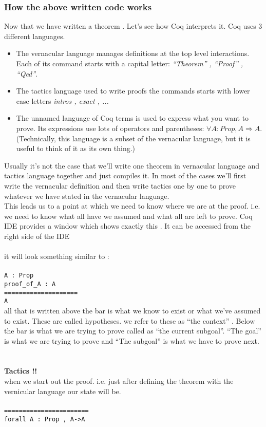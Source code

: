 \documentclass[twocolumn]{book}
\begin{document}
\subsubsection{How the above written code works}
Now that we have written a theorem . Let's see how Coq interprets it. Coq uses 3 different languages.
\begin{itemize}
\item The vernacular language manages definitions at the top level interactions. Each of its command starts with a capital
  letter: \textit{``Theorem'' , ``Proof'' , ``Qed''}.
\item The tactics language used to write proofs the commands starts with lower case letters \textit{intros , exact , ...}
\item The unnamed language of Coq terms is used to express what you want to prove. Its expressions use lots of operators and parentheses: $ \forall A : Prop, A \Longrightarrow A$. (Technically, this language is a subset of the vernacular language, but it is useful to think of it as its own thing.) 
\end{itemize}
Usually it's not the case that we'll write one theorem in vernacular language and tactics language together and just compiles it.
In most of the cases we'll first write the vernacular definition and then write tactics one by one to prove whatever we have
stated in the vernacular language.\\
This leads us to a point at which we need to know where we are at the proof. i.e. we need to know what all have we assumed and
what all are left to prove. Coq IDE provides a window which shows exactly this . It can be accessed from the right side of the IDE
\\ \\
it will look something similar to : \\ \\
\verb|A : Prop|\\
\verb|proof_of_A : A|\\
\verb|====================|\\
\verb|A|\\
all that is written above the bar is what we know to exist or what we've assumed to exist. These are called hypotheses. we refer
to these as ``the context'' . Below the bar is what we are trying to prove called as ``the current subgoal''. ``The goal'' is what
we are trying to prove and ``The subgoal'' is what we have to prove next. \\ \\ \\ 
\textbf{Tactics !!}\\
when we start out the proof. i.e. just after defining the theorem with the vernicular language our state will be.\\
\verb||\\
\verb|=======================|\\
\verb|forall A : Prop , A->A|\\
\end{document}
